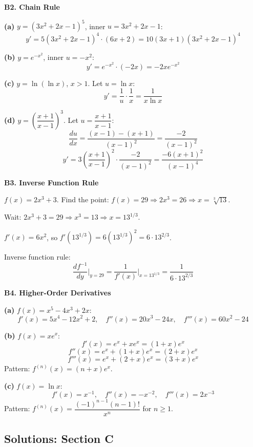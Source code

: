 \documentclass[12pt, a4paper]{article}
\theoremstyle{definition}
\newcommand{\ddd}[2]{\dfrac{d#1}{d#2}}
\begin{document}
\begin{solbox}
\textbf{B2. Chain Rule}

\textbf{(a)} $y=(3x^2+2x-1)^5$, inner $u=3x^2+2x-1$:
\[
  y' = 5(3x^2+2x-1)^4\cdot(6x+2) = 10(3x+1)(3x^2+2x-1)^4
\]

\textbf{(b)} $y=e^{-x^2}$, inner $u=-x^2$:
\[
  y' = e^{-x^2}\cdot(-2x) = -2xe^{-x^2}
\]

\textbf{(c)} $y=\ln(\ln x)$, $x>1$. Let $u=\ln x$:
\[
  y' = \frac{1}{u}\cdot\frac{1}{x} = \frac{1}{x\ln x}
\]

\textbf{(d)} $y=\left(\dfrac{x+1}{x-1}\right)^3$. Let $u=\dfrac{x+1}{x-1}$:
\[
  \ddd{u}{x} = \frac{(x-1)-(x+1)}{(x-1)^2} = \frac{-2}{(x-1)^2}
\]
\[
  y' = 3\left(\frac{x+1}{x-1}\right)^2\cdot\frac{-2}{(x-1)^2}
     = \frac{-6(x+1)^2}{(x-1)^4}
\]
\end{solbox}

\begin{solbox}
\textbf{B3. Inverse Function Rule}

$f(x)=2x^3+3$.  Find the point: $f(x)=29 \Rightarrow 2x^3=26 \Rightarrow x=\sqrt[3]{13}$.

Wait: $2x^3+3=29 \Rightarrow x^3=13 \Rightarrow x=13^{1/3}$.

$f'(x) = 6x^2$, so $f'(13^{1/3}) = 6(13^{1/3})^2 = 6\cdot 13^{2/3}$.

Inverse function rule:
\[
  \ddd{f^{-1}}{y}\bigg|_{y=29} = \frac{1}{f'(x)}\bigg|_{x=13^{1/3}}
  = \frac{1}{6\cdot 13^{2/3}}
\]
\end{solbox}

\begin{solbox}
\textbf{B4. Higher-Order Derivatives}

\textbf{(a)} $f(x)=x^5-4x^3+2x$:
\[
  f'(x) = 5x^4-12x^2+2, \quad
  f''(x) = 20x^3-24x, \quad
  f'''(x) = 60x^2-24
\]

\textbf{(b)} $f(x)=xe^x$:
\[
  f'(x) = e^x+xe^x = (1+x)e^x
\]
\[
  f''(x) = e^x+(1+x)e^x = (2+x)e^x
\]
\[
  f'''(x) = e^x+(2+x)e^x = (3+x)e^x
\]
Pattern: $f^{(n)}(x) = (n+x)e^x$.

\textbf{(c)} $f(x)=\ln x$:
\[
  f'(x) = x^{-1}, \quad f''(x) = -x^{-2}, \quad f'''(x) = 2x^{-3}
\]
Pattern: $f^{(n)}(x) = \dfrac{(-1)^{n-1}(n-1)!}{x^n}$ for $n\geq 1$.
\end{solbox}

\subsection{Solutions: Section C}
\end{document}

